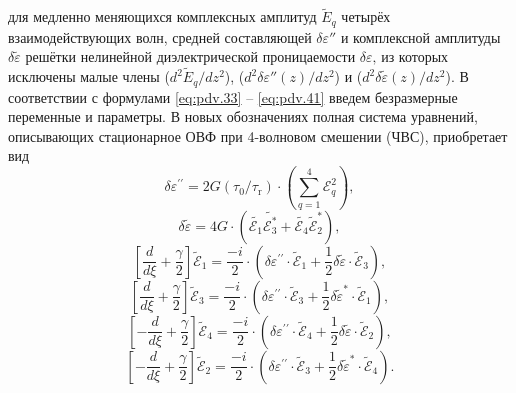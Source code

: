 для медленно меняющихся комплексных амплитуд $\tilde{E}_q$ четырёх взаимодействующих волн, средней составляющей $\delta \varepsilon''$ и комплексной амплитуды $\delta \tilde{\varepsilon}$ решётки нелинейной диэлектрической проницаемости $\delta \varepsilon$‚ из которых исключены малые члены ($d^2 \tilde{E}_q / d z^2$), ($d^2 \delta \varepsilon'' (z) / d z^2$) и ($d^2 \delta \tilde\varepsilon (z) / d z^2$).
В соответствии с формулами \eqref{eq:pdv.33} -- \eqref{eq:pdv.41} введем безразмерные переменные и параметры. В новых обозначениях полная система уравнений, описывающих
стационарное ОВФ при 4-волновом смешении (ЧВС), приобретает вид
\begin{equation}
	\label{eq:2.22}
	\delta \varepsilon^{\prime \prime}=2 G\left(\tau_{0} / \tau_{\mathrm{r}}\right) \cdot\left(\sum_{q=1}^{4} {\mathcal { E }}_{q}^{2}\right),
\end{equation}
\begin{equation}
	\label{eq:2.23}
	\delta \tilde{\varepsilon}=4 G \cdot\left(\tilde{\mathcal{E}_{1}} \tilde{\mathcal{E}_{3}^*}+\tilde{\mathcal{E}_{4}} \tilde{\mathcal{E}}_{2}^{*}\right),
\end{equation}
\begin{equation}
	\label{eq:2.24}
	\left[\frac{d}{d \xi}+\frac{\gamma}{2}\right] \tilde{\mathcal{E}}_{1}=\frac{-i}{2} \cdot\left(\delta \varepsilon^{\prime \prime} \cdot \tilde{\mathcal{E}}_{1}+\frac{1}{2} \delta \tilde{\varepsilon} \cdot \tilde{\mathcal{E}}_{3}\right),
\end{equation}
\begin{equation}
	\label{eq:2.25}
	\left[\frac{d}{d \xi}+\frac{\gamma}{2}\right] \tilde{\mathcal{E}}_{3}=\frac{-i}{2} \cdot\left(\delta \varepsilon^{\prime \prime} \cdot \tilde{\mathcal{E}}_{3}+\frac{1}{2} \delta \tilde{\varepsilon}^{*} \cdot \tilde{\mathcal{E}}_{1}\right),
\end{equation}
\begin{equation}
	\label{eq:2.26}
	\left[-\frac{d}{d \xi}+\frac{\gamma}{2}\right] \tilde{\mathcal{E}}_{4}=\frac{-i}{2} \cdot\left(\delta \varepsilon^{\prime \prime} \cdot \tilde{\mathcal{E}}_{4}+\frac{1}{2} \delta \tilde{\varepsilon} \cdot \tilde{\mathcal{E}}_{2}\right),
\end{equation}
\begin{equation}
	\label{eq:2.27}
	\left[-\frac{d}{d \xi}+\frac{\gamma}{2}\right] \tilde{\mathcal{E}}_{2}=\frac{-i}{2} \cdot\left(\delta \varepsilon^{\prime \prime} \cdot \tilde{\mathcal{E}}_{3}+\frac{1}{2} \delta \tilde{\varepsilon}^{*} \cdot \tilde{\mathcal{E}}_{4}\right).
\end{equation}
